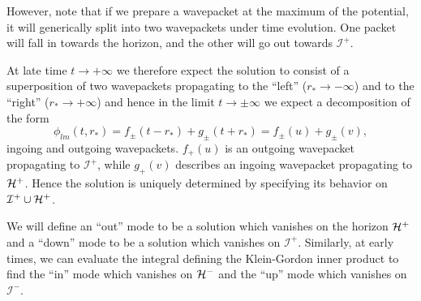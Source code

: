 However, note that if we prepare a wavepacket at the maximum of the potential, it will generically split into two wavepackets under time evolution. One packet will fall in towards the horizon, and the other will go out towards $\mathcal{I}^+$.

At late time $t\to +\infty$ we therefore expect the solution to consist of a superposition of two wavepackets propagating to the ``left'' ($r_*\to -\infty$) and to the ``right'' ($r_*\to +\infty$) and hence in the limit $t\to \pm \infty$ we expect a decomposition of the form
\begin{equation}
     \phi_{lm}(t,r_*) = f_\pm (t-r_*) + g_\pm (t+ r_*) = f_\pm (u) + g_\pm(v),
\end{equation}
ingoing and outgoing wavepackets. $f_+(u)$ is an outgoing wavepacket propagating to $\mathcal{I}^+$, while $g_+(v)$ describes an ingoing wavepacket propagating to $\mathcal H^+$.
Hence the solution is uniquely determined by specifying its behavior on $\mathcal{I}^+ \cup \mathcal H^+$.

We will define an ``out'' mode to be a solution which vanishes on the horizon $\mathcal H^+$ and a ``down'' mode to be a solution which vanishes on $\mathcal{I}^+$.
Similarly, at early times, we can evaluate the integral defining the Klein-Gordon inner product to find the ``in'' mode which vanishes on $\mathcal H^-$ and the ``up'' mode which vanishes on $\mathcal{I}^-$.